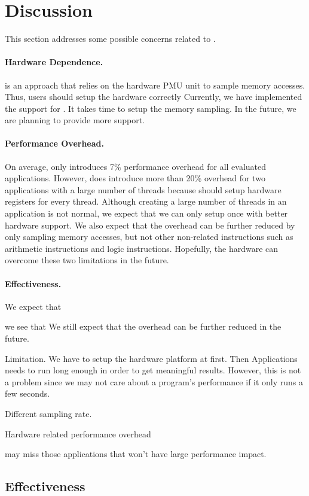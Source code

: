 \section{Discussion}

\label{sec:discuss}

This section addresses some possible concerns related to \Cheetah{}. 

\paragraph{Hardware Dependence.} \cheetah{} is an approach that relies on the hardware PMU unit to sample memory accesses. Thus, users should setup the hardware correctly  Currently, we have implemented the support for . It takes time to setup the memory sampling. In the future, we are planning to provide more support.
 
\paragraph{Performance Overhead.} On average, \Cheetah{} only introduces 7\% performance overhead for all evaluated applications. However, \cheetah{} does introduce more than 20\% overhead for two applications with a large number of threads because \cheetah{} should setup hardware registers for every thread. Although creating a large number of threads in an application is not normal, we expect that we can only setup once  with better hardware support. We also expect that the overhead can be further reduced by only sampling memory accesses, but not other non-related instructions such as arithmetic instructions and logic instructions. Hopefully, the hardware can overcome these two limitations in the future.

\paragraph{Effectiveness.} 

We expect that 


we see that \Cheetah{} We still expect that the overhead can be further reduced in the future.  

Limitation. 
We have to setup the hardware platform at first. 
Then Applications needs to run long enough in order to get meaningful results. 
However, this is not a problem since we may not care about a program's performance if it only runs a few seconds. 

Different sampling rate. 

Hardware related performance overhead 


\Cheetah{} may miss those applications that won't have large performance impact. 

\subsection{Effectiveness}
